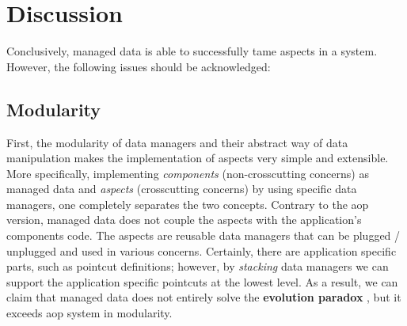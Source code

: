 

\section{Discussion}\label{Evaluation Discussion}
Conclusively, managed data is able to successfully tame aspects in a system.
However, the following issues should be acknowledged:

\subsection{Modularity}
First, the modularity of data managers and their abstract way of data manipulation makes the implementation of aspects very simple and extensible.
More specifically, implementing \textit{components} (non-crosscutting concerns) as managed data and \textit{aspects} (crosscutting concerns) by using specific data managers, one completely separates the two concepts.
Contrary to the \ac{aop} version, managed data does not couple the aspects with the application's components code.
The aspects are reusable data managers that can be plugged / unplugged and used in various concerns.
Certainly, there are application specific parts, such as pointcut definitions; however, by \textit{stacking} data managers we can support the application specific pointcuts at the lowest level.
As a result, we can claim that managed data does not entirely solve the \textbf{evolution paradox} \cite{tourwe2003existence}, but it exceeds \ac{aop} system in modularity.

